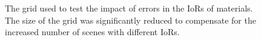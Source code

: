 \documentclass[11pt, letterpaper]{extarticle} %
\begin{document}
\begin{figure}[h]
    \centering
    \hfill
    \caption{The grid used to test the impact of errors in the IoRs of materials. The size of the grid was significantly reduced to compensate for the increased number of scenes with different IoRs.}
    \label{fig:small_testing_grid}
\end{figure}
\end{document}
